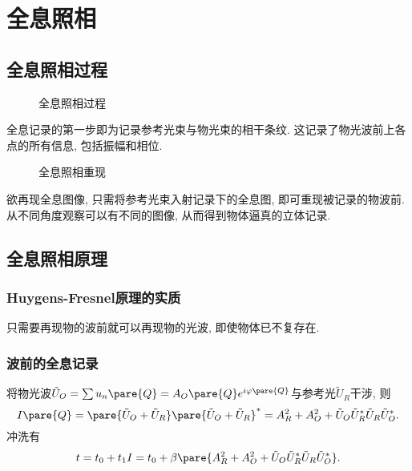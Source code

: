 \documentclass{ctexart}
\begin{document}
\section{全息照相} %
\label{sec:全息照相}

\subsection{全息照相过程} %
\label{sub:全息照相过程}

\begin{figure}[ht]
    \centering
    \caption{全息照相过程}
\end{figure}
全息记录的第一步即为记录参考光束与物光束的相干条纹. 这记录了物光波前上各点的所有信息, 包括振幅和相位.
\par
\begin{figure}[ht]
    \centering
    \caption{全息照相重现}
\end{figure}
欲再现全息图像, 只需将参考光束入射记录下的全息图, 即可重现被记录的物波前. 从不同角度观察可以有不同的图像, 从而得到物体逼真的立体记录.


\subsection{全息照相原理} %
\label{sub:全息照相原理}

\subsubsection{Huygens-Fresnel原理的实质} %
\label{ssub:huygens_fresnel原理的实质}

只需要再现物的波前就可以再现物的光波, 即使物体已不复存在.


\subsubsection{波前的全息记录} %
\label{ssub:波前的全息记录}

将物光波$\tilde{U}_O = \sum u_n\pare{Q} = A_O\pare{Q} e^{i\varphi\pare{Q}}$与参考光$\tilde{U}_R$干涉, 则
\[ I\pare{Q} = \pare{\tilde{U}_O + \tilde{U}_R}\pare{\tilde{U}_O + \tilde{U}_R}^* = A_R^2 + A_O^2 + \tilde{U}_O \tilde{U}_R^* \tilde{U}_R \tilde{U}_O ^*. \]
冲洗有
\[ t = t_0 + t_1 I = t_0 + \beta \pare{A_R^2 + A_O^2 + \tilde{U}_O \tilde{U}_R^* \tilde{U}_R \tilde{U}_O ^*}. \]
\end{document}
